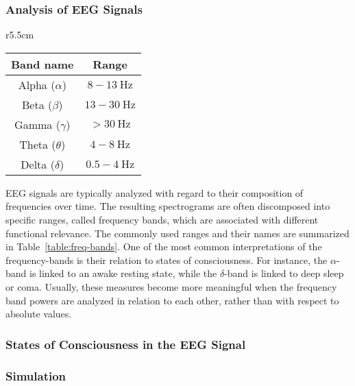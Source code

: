 \subsubsection{Analysis of EEG Signals}
\begin{wraptable}{r}{5.5cm}
    \centering
    \begin{tabular}{ |c|c| }
        \hline
        \textbf{Band name} & \textbf{Range} \\
        \hline
        \hline
        Alpha ($\alpha$) & $8-\SI{13}{\hertz}$ \\
        \hline
        Beta ($\beta$) & $13-\SI{30}{\hertz}$ \\
        \hline
        Gamma ($\gamma$) & $>\SI{30}{\hertz}$ \\
        \hline
        Theta ($\theta$) & $4-\SI{8}{\hertz}$ \\
        \hline
        Delta ($\delta$) & $0.5-\SI{4}{\hertz}$ \\

        \hline
    \end{tabular}
    \caption{\textbf{EEG Frequency Bands}}
    \label{table:freq-bands}
\end{wraptable}
EEG signals are typically analyzed with regard to their composition of frequencies over time.
The resulting spectrograms are often discomposed into specific ranges, called frequency bands,
which are associated with different functional relevance.
The commonly used ranges and their names are summarized in Table~\ref{table:freq-bands}.
One of the most common interpretations of the frequency-bands is their relation to states of consciousness.
For instance, the $\alpha$-band is linked to an awake resting state,
while the $\delta$-band is linked to deep sleep or coma.
Usually, these measures become more meaningful when the frequency band powers are analyzed in relation to each other,
rather than with respect to absolute values.

\subsubsection{States of Consciousness in the EEG Signal}\label{subsubsec:states-of-consciousness-in-the-eeg-signal}
\qquad {}








\subsubsection{Simulation}\label{subsec:simulation}

